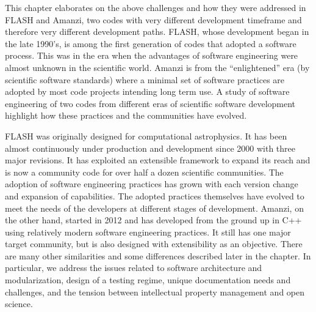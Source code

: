 This chapter elaborates on the above challenges and how they were
addressed in FLASH and Amanzi, two codes with very  
different development timeframe and therefore very different
development paths. FLASH, whose development began in the late 1990's,
is among the first generation of codes that
adopted a software process. This was in the era when the advantages of
software engineering were almost unknown in the scientific
world. Amanzi is from the ``enlightened'' era (by scientific software
standards) where a minimal set of software practices are adopted by
most code projects intending long term use. A study of software
engineering of two codes from different eras of scientific software
development highlight how these practices  and the communities have
evolved.    

FLASH was originally designed for computational
astrophysics. It has been almost continuously 
under production and development since 2000 with three major
revisions. It has exploited an extensible framework to expand its
reach and is now a community code for over half a dozen scientific
communities. The adoption of software engineering practices has
grown with each version change and expansion of capabilities. The
adopted practices themselves have evolved to meet the needs of the
developers at different stages of development. Amanzi, on the other
hand, started in 2012 and has developed 
from the ground up in C++ using relatively modern software engineering
practices. It still has one major target community, but is also
designed with extensibility as an objective. There are many other
similarities and some differences described later in the chapter.
In particular, we address the issues related to software
architecture and modularization, design of a testing regime,
unique documentation needs and challenges, and the tension between intellectual property
management and open science.

 
